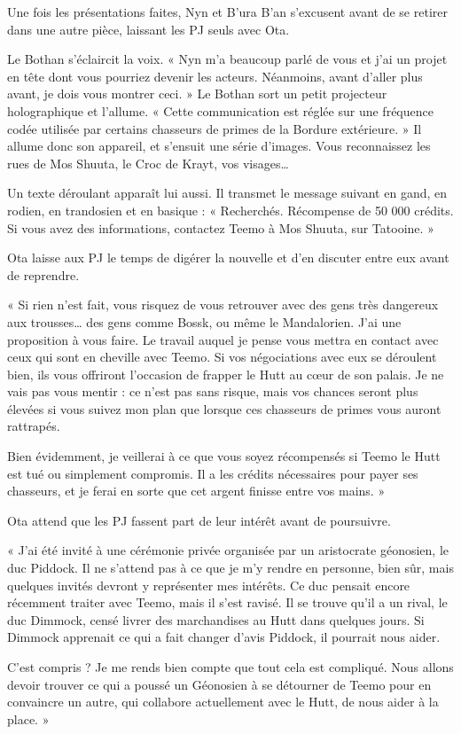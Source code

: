 \documentclass[a4paper,10pt,twoside,twocolumn,openany]{book}
\begin{document}
Une fois les présentations faites, Nyn et B’ura B’an
s’excusent avant de se retirer dans une autre pièce, laissant les PJ seuls avec Ota.

\begin{quotebox}
Le Bothan s’éclaircit la voix. « Nyn m’a beaucoup
parlé de vous et j’ai un projet en tête dont vous
pourriez devenir les acteurs. Néanmoins, avant d’aller plus avant, je dois vous montrer ceci. » Le Bothan
sort un petit projecteur holographique et l’allume.
« Cette communication est réglée sur une fréquence
codée utilisée par certains chasseurs de primes de
la Bordure extérieure. » Il allume donc son appareil,
et s’ensuit une série d’images. Vous reconnaissez les
rues de Mos Shuuta, le Croc de Krayt, vos visages…

Un texte déroulant apparaît lui aussi. Il transmet
le message suivant en gand, en rodien, en trandosien et en basique : « Recherchés. Récompense
de 50 000 crédits. Si vous avez des informations,
contactez Teemo à Mos Shuuta, sur Tatooine. »
\end{quotebox}

Ota laisse aux PJ le temps de digérer la nouvelle et
d’en discuter entre eux avant de reprendre.

\begin{quotebox}
« Si rien n’est fait, vous risquez de vous retrouver
avec des gens très dangereux aux trousses… des
gens comme Bossk, ou même le Mandalorien.
J’ai une proposition à vous faire. Le travail auquel
je pense vous mettra en contact avec ceux qui
sont en cheville avec Teemo. Si vos négociations
avec eux se déroulent bien, ils vous offriront l’occasion de frapper le Hutt au cœur de son palais. Je
ne vais pas vous mentir : ce n’est pas sans risque,
mais vos chances seront plus élevées si vous suivez mon plan que lorsque ces chasseurs de primes
vous auront rattrapés.

Bien évidemment, je veillerai à ce que vous soyez
récompensés si Teemo le Hutt est tué ou simplement compromis. Il a les crédits nécessaires pour
payer ses chasseurs, et je ferai en sorte que cet
argent finisse entre vos mains. »
\end{quotebox}

Ota attend que les PJ fassent part de leur intérêt avant
de poursuivre.

\begin{quotebox}
« J’ai été invité à une cérémonie privée organisée
par un aristocrate géonosien, le duc Piddock. Il ne
s’attend pas à ce que je m’y rendre en personne,
bien sûr, mais quelques invités devront y représenter mes intérêts. Ce duc pensait encore récemment traiter avec Teemo, mais il s’est ravisé. Il se
trouve qu’il a un rival, le duc Dimmock, censé livrer
des marchandises au Hutt dans quelques jours. Si
Dimmock apprenait ce qui a fait changer d’avis
Piddock, il pourrait nous aider.

C’est compris ? Je me rends bien compte que
tout cela est compliqué. Nous allons devoir trouver ce qui a poussé un Géonosien à se détourner
de Teemo pour en convaincre un autre, qui collabore actuellement avec le Hutt, de nous aider à
la place. »
\end{quotebox}
\end{document}

